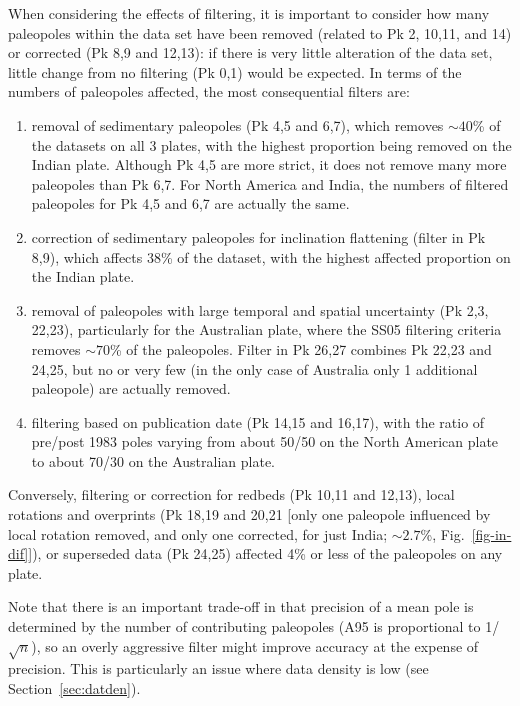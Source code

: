 When considering the effects of filtering, it is important to consider how many
paleopoles within the data set have been removed (related to Pk 2,
10,11, and 14) or corrected (Pk 8,9 and 12,13): if there is very
little alteration of the data set, little change from no filtering (Pk 0,1)
would be expected. In terms of the numbers of paleopoles affected, the most
consequential filters are:
%
\begin{enumerate}
  \item removal of sedimentary paleopoles (Pk 4,5 and 6,7), which removes
    ${\sim}40$\% of the datasets on all 3 plates, with the highest
    proportion being removed on the Indian plate. Although Pk 4,5 are more
    strict, it does not remove many more paleopoles than Pk 6,7. For North
    America and India, the numbers of filtered paleopoles for Pk 4,5 and 6,7 are
    actually the same.
  \item correction of sedimentary paleopoles for inclination flattening (filter
    in Pk 8,9), which affects 38\% of the dataset, with the highest
    affected proportion on the Indian plate.
  \item removal of paleopoles with large temporal and spatial uncertainty (Pk
    2,3, 22,23), particularly for the Australian plate, where the SS05 filtering
    criteria removes ${\sim}70$\% of the paleopoles. Filter in Pk 26,27 combines
    Pk 22,23 and 24,25, but no or very few (in the only case of Australia only 1
    additional paleopole) are actually removed.
  \item filtering based on publication date (Pk 14,15 and 16,17), with the ratio
    of pre/post 1983 poles varying from about 50/50 on the North American plate
    to about 70/30 on the Australian plate.
\end{enumerate}

Conversely, filtering or correction for redbeds (Pk 10,11 and 12,13), local
rotations and overprints (Pk 18,19 and 20,21 [only one paleopole influenced by
local rotation removed, and only one corrected, for just India; ${\sim}2.7$\%,
Fig.~\ref{fig-in-dif}]), or superseded data (Pk 24,25) affected 4\% or less of
the paleopoles on any plate.

Note that there is an important trade-off in that precision of a mean pole is
determined by the number of contributing paleopoles (A95 is proportional to
1/$\sqrt{n}$), so an overly aggressive filter might improve accuracy at the
expense of precision. This is particularly an issue where data density is low
(see Section~\ref{sec:datden}).

